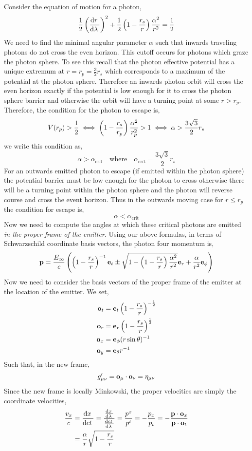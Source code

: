 \documentclass[12pt]{article}
\begin{document}
Consider the equation of motion for a photon,
\[ \frac{1}{2} \left( \deriv{r}{\lambda} \right)^2 + \frac{1}{2} \sh{r} \frac{\alpha^2}{r^2} = \frac{1}{2} \]
We need to find the minimal angular parameter $\alpha$ such that inwards traveling photons do not cross the even horizon. This cutoff occurs for photons which graze the photon sphere. To see this recall that the photon effective potential has a unique extremum at $r = r_p = \tfrac{3}{2} r_s$ which corresponds to a maximum of the potential at the photon sphere. Therefore an inwards photon orbit will cross the even horizon exactly if the potential is low enough for it to cross the photon sphere barrier and otherwise the orbit will have a turning point at some $r > r_p$. Therefore, the condition for the photon to escape is,
\[ V(r_p) > \frac{1}{2} \iff \sh{r_p} \frac{\alpha^2}{r_p^2} > 1 \iff \alpha > \frac{3 \sqrt{3}}{2} r_s \]
we write this condition as,
\[ \alpha > \alpha_{\text{crit}} \quad \text{where} \quad \alpha_{\text{crit}} = \frac{3 \sqrt{3}}{2} r_s \]
For an outwards emitted photon to escape (if emitted within the photon sphere) the potential barrier must be low enough for the photon to cross otherwise there will be a turning point within the photon sphere and the photon will reverse course and cross the event horizon. Thus in the outwards moving case for $r \le r_p$ the condition for escape is,
\[ \alpha < \alpha_{\text{crit}} \]
Now we need to compute the angles at which these critical photons are emitted \textit{in the proper frame of the emitter}. Using our above formulas, in terms of Schwarzschild coordinate basis vectors, the photon four momentum is,
\[ \bf{p} = \frac{E_\infty}{c} \left( \sh{r}^{-1} \bf{e}_t \pm \sqrt{1 - \sh{r} \frac{\alpha^2}{r^2}} \bf{e}_r + \frac{\alpha}{r^2} \bf{e}_\phi \right) \]
Now we need to consider the basis vectors of the proper frame of the emitter at the location of the emitter. We set,
\begin{align*}
\bf{o}_t & = \bf{e}_t \sh{r}^{-\frac{1}{2}}
\\
\bf{o}_r & = \bf{e}_r \sh{r}^{\frac{1}{2}}
\\
\bf{o}_x & = \bf{e}_\phi (r \sin{\theta})^{-1}
\\
\bf{o}_y & = \bf{e}_{\theta} r^{-1}
\end{align*}
Such that, in the new frame,
\[ g'_{\mu \nu} = \bf{o}_\mu \cdot \bf{o}_\nu = \eta_{\mu \nu} \]
Since the new frame is locally Minkowski, the proper velocities are simply the coordinate velocities,
\begin{align*}
\frac{v_x}{c} & = \deriv{x}{ct} = \frac{\deriv{x}{\lambda}}{\deriv{ct}{\lambda}} = \frac{p^x}{p^t} = - \frac{p_x}{p_t} = - \frac{\bf{p} \cdot \bf{o}_x}{\bf{p} \cdot \bf{o}_t} 
\\
& = \frac{\alpha}{r} \sqrt{1 - \frac{r_s}{r}} 
\end{align*}
\end{document}
